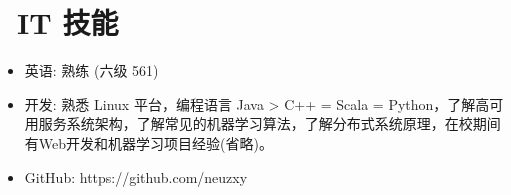 \documentclass{resume}
\begin{document}
\section{\faCogs\ IT 技能}
\begin{itemize}[parsep=0.5ex]
  \item 英语: 熟练 (六级 561)
  \item 开发: 熟悉 Linux 平台，编程语言 Java > C++ = Scala = Python，了解高可用服务系统架构，了解常见的机器学习算法，了解分布式系统原理，在校期间有Web开发和机器学习项目经验(省略)。
  \item GitHub: https://github.com/neuzxy
\end{itemize}

%

%
%
\end{document}
